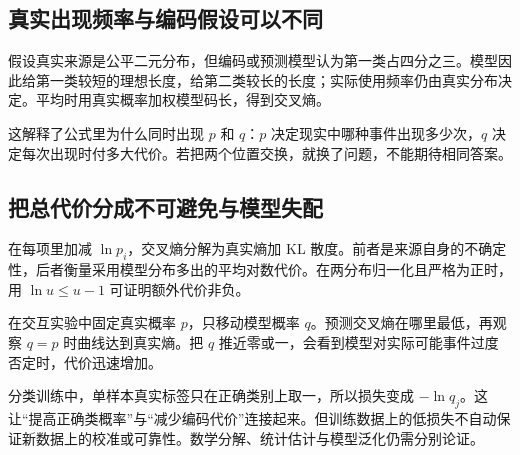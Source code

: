 \subsection*{真实出现频率与编码假设可以不同}
假设真实来源是公平二元分布，但编码或预测模型认为第一类占四分之三。模型因此给第一类较短的理想长度，给第二类较长的长度；实际使用频率仍由真实分布决定。平均时用真实概率加权模型码长，得到交叉熵。

这解释了公式里为什么同时出现 $p$ 和 $q$：$p$ 决定现实中哪种事件出现多少次，$q$ 决定每次出现时付多大代价。若把两个位置交换，就换了问题，不能期待相同答案。

\subsection*{把总代价分成不可避免与模型失配}
在每项里加减 $\ln p_i$，交叉熵分解为真实熵加 KL 散度。前者是来源自身的不确定性，后者衡量采用模型分布多出的平均对数代价。在两分布归一化且严格为正时，用 $\ln u\le u-1$ 可证明额外代价非负。

在交互实验中固定真实概率 $p$，只移动模型概率 $q$。预测交叉熵在哪里最低，再观察 $q=p$ 时曲线达到真实熵。把 $q$ 推近零或一，会看到模型对实际可能事件过度否定时，代价迅速增加。

分类训练中，单样本真实标签只在正确类别上取一，所以损失变成 $-\ln q_j$。这让“提高正确类概率”与“减少编码代价”连接起来。但训练数据上的低损失不自动保证新数据上的校准或可靠性。数学分解、统计估计与模型泛化仍需分别论证。
